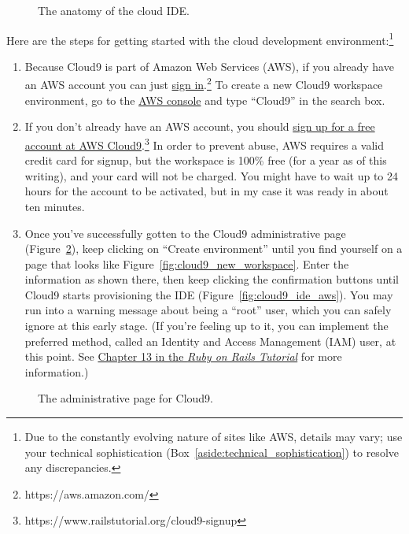 \begin{figure}
\begin{center}
\end{center}
\caption{The anatomy of the cloud IDE.\label{fig:ide_anatomy}}
\end{figure}

Here are the steps for getting started with the cloud development environment:\footnote{Due to the constantly evolving nature of sites like AWS, details may vary; use your technical sophistication (Box~\ref{aside:technical_sophistication}) to resolve any discrepancies.}
\begin{enumerate}
\item Because Cloud9 is part of Amazon Web Services (AWS), if you already have an AWS account you can just \href{https://aws.amazon.com/}{sign in}.\footnote{https://aws.amazon.com/} To create a new Cloud9 workspace environment, go to the \href{https://console.aws.amazon.com/}{AWS console} and type ``Cloud9'' in the search box.
\item If you don't already have an AWS account, you should \href{https://www.railstutorial.org/cloud9-signup}{sign up for a free account at AWS Cloud9}.\footnote{https://www.railstutorial.org/cloud9-signup} In order to prevent abuse, AWS requires a valid credit card for signup, but the workspace is 100\% free (for a year as of this writing), and your card will not be charged. You might have to wait up to 24 hours for the account to be activated, but in my case it was ready in about ten minutes.
\item Once you've successfully gotten to the Cloud9 administrative page (Figure~\ref{fig:cloud9_page_aws}), keep clicking on ``Create environment'' until you find yourself on a page that looks like Figure~\ref{fig:cloud9_new_workspace}. Enter the information as shown there, then keep clicking the confirmation buttons until Cloud9 starts provisioning the IDE (Figure~\ref{fig:cloud9_ide_aws}). You may run into a warning message about being a ``root'' user, which you can safely ignore at this early stage. (If you're feeling up to it, you can implement the preferred method, called an Identity and Access Management (IAM) user, at this point. See \href{https://www.railstutorial.org/book/user_microposts#sec-image_upload_in_production}{Chapter 13 in the \href{https://www.railstutorial.org/}{\emph{Ruby on Rails Tutorial}}} for more information.)
\end{enumerate}

\begin{figure}
\begin{center}
\end{center}
\caption{The administrative page for Cloud9.\label{fig:cloud9_page_aws}}
\end{figure}

